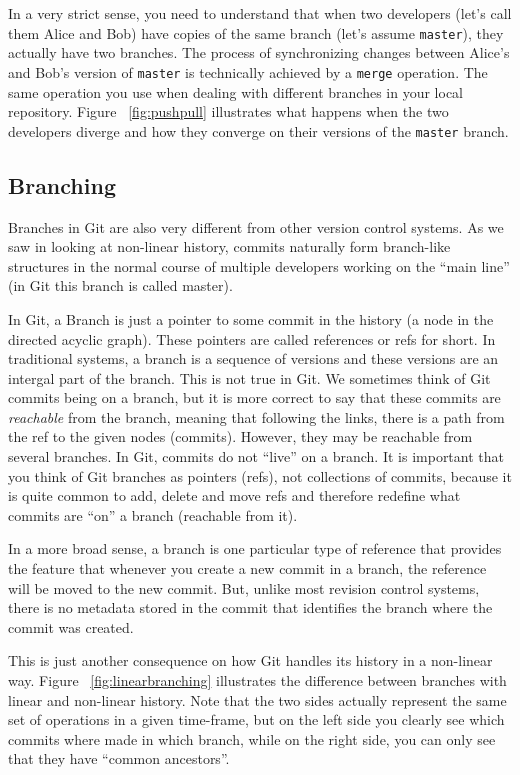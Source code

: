 In a very strict sense, you need to understand that when two
developers (let's call them Alice and Bob) have copies of the same
branch (let's assume \texttt{master}), they actually have two
branches. The process of synchronizing changes between Alice's and
Bob's version of \texttt{master} is technically achieved by a
\texttt{merge} operation. The same operation you use when dealing with
different branches in your local repository. Figure
~\ref{fig:pushpull} illustrates what happens when the two developers
diverge and how they converge on their versions of the \texttt{master}
branch.


\subsection{Branching}

Branches in Git are also very different from other version control
systems.  As we saw in looking at non-linear history, commits
naturally form branch-like structures in the normal course of
multiple developers working on the ``main line'' (in Git this branch
is called master).

In Git, a Branch is just a pointer to some commit in the history (a
node in the directed acyclic graph).
These pointers are called references or refs for short.
In traditional systems, a branch is a sequence of versions and these
versions are an intergal part of the branch.
This is not true in Git.
We sometimes think of Git commits being on a branch, but it is more
correct to say that these commits are \emph{reachable} from the
branch, meaning that following the links, there is a path from the
ref to the given nodes (commits).
However, they may be reachable from several branches.
In Git, commits do not ``live'' on a branch.
It is important that you think of Git branches as pointers (refs),
not collections of commits, because it is quite common to add,
delete and move refs and therefore redefine what commits are ``on''
a branch (reachable from it).

In a more broad sense, a branch is one particular type of reference
that provides the feature that whenever you create a new commit in a
branch, the reference will be moved to the new commit. But, unlike
most revision control systems, there is no metadata stored in the
commit that identifies the branch where the commit was created.

This is just another consequence on how Git handles its history in a
non-linear way. Figure ~\ref{fig:linearbranching} illustrates the
difference between branches with linear and non-linear history. Note
that the two sides actually represent the same set of operations in a
given time-frame, but on the left side you clearly see which commits
where made in which branch, while on the right side, you can only see
that they have ``common ancestors''.

